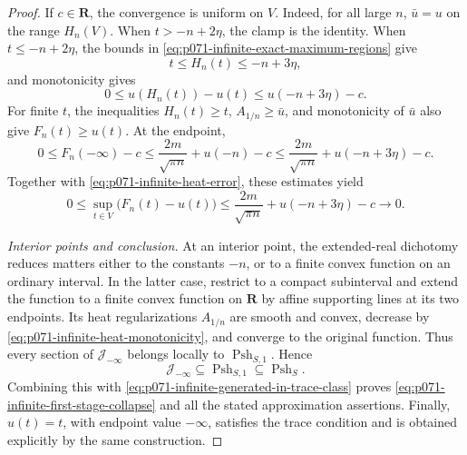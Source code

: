 \begin{proof}
If \(c\in\mathbf R\), the convergence is uniform on \(V\).  Indeed, for
all large \(n\), \(\bar u=u\) on the range \(H_n(V)\).  When
\(t>-n+2\eta\), the clamp is the identity.  When
\(t\leq-n+2\eta\), the bounds in
\eqref{eq:p071-infinite-exact-maximum-regions} give
\[
                 t\leq H_n(t)\leq-n+3\eta,
\]
and monotonicity gives
\[
 0\leq u(H_n(t))-u(t)\leq u(-n+3\eta)-c.
\]
For finite \(t\), the inequalities \(H_n(t)\geq t\),
\(A_{1/n}\geq\bar u\), and monotonicity of \(\bar u\) also give
\(F_n(t)\geq u(t)\).  At the endpoint,
\[
 0\leq F_n(-\infty)-c
 \leq\frac{2m}{\sqrt{\pi n}}+u(-n)-c
 \leq\frac{2m}{\sqrt{\pi n}}+u(-n+3\eta)-c.
\]
Together with \eqref{eq:p071-infinite-heat-error}, these estimates yield
\[
 0\leq\sup_{t\in V}\bigl(F_n(t)-u(t)\bigr)
 \leq\frac{2m}{\sqrt{\pi n}}
       +u(-n+3\eta)-c\longrightarrow0.
\]

\medskip\noindent\emph{Interior points and conclusion.}
At an interior point, the extended-real dichotomy reduces matters either
to the constants \(-n\), or to a finite convex function on an ordinary
interval.  In the latter case, restrict to a compact subinterval and
extend the function to a finite convex function on \(\mathbf R\) by
affine supporting lines at its two endpoints.  Its heat regularizations
\(A_{1/n}\) are smooth and convex, decrease by
\eqref{eq:p071-infinite-heat-monotonicity}, and converge to the original
function.  Thus every section of \(\mathscr J_{-\infty}\) belongs locally
to \(\operatorname{Psh}_{S,1}\).  Hence
\[
 \mathscr J_{-\infty}\subseteq\operatorname{Psh}_{S,1}
 \subseteq\operatorname{Psh}_S.
\]
Combining this with
\eqref{eq:p071-infinite-generated-in-trace-class} proves
\eqref{eq:p071-infinite-first-stage-collapse} and all the stated
approximation assertions.  Finally, \(u(t)=t\), with endpoint value
\(-\infty\), satisfies the trace condition and is obtained explicitly
by the same construction.
\end{proof}
